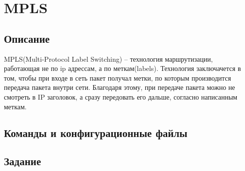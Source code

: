 \section{MPLS}
\subsection{Описание}

MPLS(Multi-Protocol Label Switching) -- технология маршрутизации,
работающая не по ip адрессам, а по меткам(labels). 
Технология заключачется в том, чтобы при входе в сеть 
пакет получал метки, по которым производится передача пакета внутри сети.
Благодаря этому, при передаче пакета можно не смотреть в IP заголовок, а 
сразу передовать его дальше, согласно написанным меткам.

\subsection{}
\subsection{Команды и конфигурационные файлы}
\subsection{Задание}

